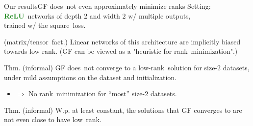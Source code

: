 \documentclass[handout,usenames,dvipsnames]{beamer} %
\newcommand{\true}[1]{{\textcolor{ForestGreen}{\textbf{#1}}}}
\begin{document}
\begin{frame}{Our results}{GF does~not even approximately minimize ranks}
    \pause
    Setting: \true{ReLU}~networks of depth $2$ and width $2$ w/ multiple outputs,\\
    \pause
    trained w/ the square~loss.
    \pause
    \begin{exampleblock}{\cite{li2020towards,razin2020implicit} (matrix/tensor~fact.)}
        \alert{Linear} networks of this architecture are implicitly biased towards low-rank. (GF can be viewed as a "heuristic for rank~minimization".)
    \end{exampleblock}
    \pause
    \begin{exampleblock}{Thm. (informal) \hfill\checkmark}
          GF does~not converge to a low-rank~solution for size-$2$ datasets, under mild assumptions on the dataset and initialization.
    \end{exampleblock}
    \pause
    \begin{itemize}
        \item $\Rightarrow$ No rank~minimization for ``most'' size-$2$ datasets.
    \end{itemize}
    \pause
    \begin{exampleblock}{Thm. (informal) \hfill\checkmark}
          W.p. at least constant, the solutions that GF converges to are not even close to have low~rank.
    \end{exampleblock}
\end{frame}
\end{document}
